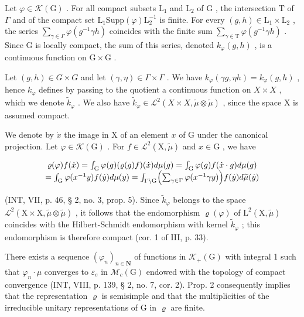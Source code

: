Let \(\varphi \in \mathcal{K}(\mathrm{G})\) . For all compact subsets \(\mathrm{L}_1\) and \(\mathrm{L}_2\) of \(\mathrm{G}\) , the intersection \(\mathrm{T}\) of \(\Gamma\) and of the compact set \(\mathrm{L}_1\mathrm{Supp}(\varphi)\mathrm{L}_2^{-1}\) is finite. For every \((g,h) \in \mathrm{L}_1 \times \mathrm{L}_2\) , the series \(\sum_{\gamma \in \Gamma} \varphi(g^{-1}\gamma h)\) coincides with the finite sum \(\sum_{\gamma \in \mathrm{T}} \varphi(g^{-1}\gamma h)\) . Since \(\mathrm{G}\) is locally compact, the sum of this series, denoted \(k_{\varphi}(g,h)\) , is a continuous function on \(\mathrm{G} \times \mathrm{G}\) .

Let \((g,h) \in G \times G\) and let \((\gamma, \eta) \in \Gamma \times \Gamma\) . We have \(k_{\varphi}(\gamma g, \eta h) = k_{\varphi}(g, h)\) , hence \(k_{\varphi}\) defines by passing to the quotient a continuous function on \(X \times X\) , which we denote \(\widetilde{k}_{\varphi}\) . We also have \(\widetilde{k}_{\varphi} \in \mathcal{L}^{2}(X \times X, \widetilde{\mu} \otimes \widetilde{\mu})\) , since the space X is assumed compact.

We denote by \(\dot{x}\) the image in X of an element \(x\) of G under the canonical projection. Let \(\varphi \in \mathcal{K}(\mathrm{G})\) . For \(f \in \mathcal{L}^2(\mathrm{X},\widetilde{\mu})\) and \(x \in \mathrm{G}\) , we have

\[
\begin{array}{c} \varrho (\varphi) f (\dot {x}) = \int_ {\mathrm{G}} \varphi (g)   (\varrho (g) f) (\dot {x}) d \mu (g) = \int_ {\mathrm{G}} \varphi (g) f (\dot {x} \cdot g) d \mu (g) \\ = \int_ {\mathrm{G}} \varphi (x ^ {- 1} y) f (\dot {y}) d \mu (y) = \int_ {\Gamma \backslash \mathrm{G}} \Bigl (\sum_ {\gamma \in \Gamma} \varphi (x ^ {- 1} \gamma y) \Bigr) f (\dot {y}) d \widetilde {\mu} (\dot {y}) \end{array}
\]

(INT, VII, p. 46, § 2, no. 3, prop. 5). Since \(\widetilde{k}_{\varphi}\) belongs to the space \(\mathcal{L}^2 (\mathrm{X}\times \mathrm{X},\widetilde{\mu}\otimes \widetilde{\mu})\) , it follows that the endomorphism \(\varrho (\varphi)\) of \(\mathrm{L}^2 (\mathrm{X},\widetilde{\mu})\) coincides with the Hilbert-Schmidt endomorphism with kernel \(\widetilde{k}_{\varphi}\) ; this endomorphism is therefore compact (cor. 1 of III, p. 33).

There exists a sequence \((\varphi_{n})_{n\in\mathbf{N}}\) of functions in \(\mathcal{K}_{+}(\mathrm{G})\) with integral 1 such that \(\varphi_{n}\cdot\mu\) converges to \(\varepsilon_{e}\) in \(\mathcal{M}_{c}(\mathrm{G})\) endowed with the topology of compact convergence (INT, VIII, p. 139, § 2, no. 7, cor. 2). Prop. 2 consequently implies that the representation \(\varrho\) is semisimple and that the multiplicities of the irreducible unitary representations of G in \(\varrho\) are finite.

